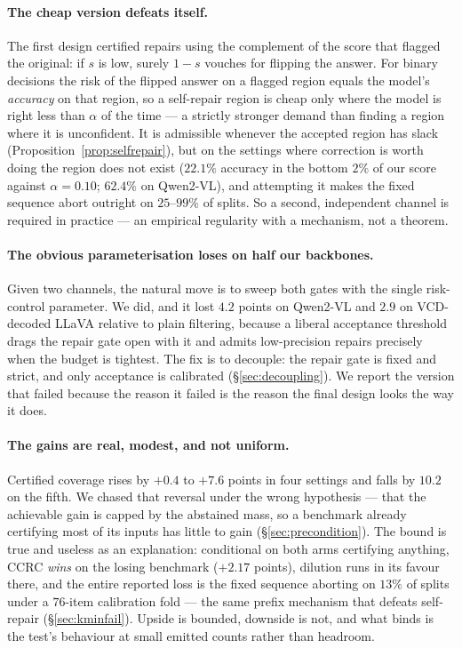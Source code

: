 \documentclass{article}
\theoremstyle{plain}
\theoremstyle{definition}
\theoremstyle{remark}
\begin{document}
\paragraph{The cheap version defeats itself.}
The first design certified repairs using the complement of the score that flagged the
original: if $s$ is low, surely $1-s$ vouches for flipping the answer. For binary decisions
the risk of the flipped answer on a flagged region equals the model's \emph{accuracy} on that
region, so a self-repair region is cheap only where the model is right less than $\alpha$ of
the time --- a strictly stronger demand than finding a region where it is unconfident. It is
admissible whenever the accepted region has slack (Proposition~\ref{prop:selfrepair}), but on
the settings where correction is worth doing the region does not exist ($22.1\%$ accuracy in
the bottom $2\%$ of our score against $\alpha=0.10$; $62.4\%$ on Qwen2-VL), and attempting it
makes the fixed sequence abort outright on $25$--$99\%$ of splits. So a second, independent
channel is required in practice --- an empirical regularity with a mechanism, not a theorem.

\paragraph{The obvious parameterisation loses on half our backbones.}
Given two channels, the natural move is to sweep both gates with the single risk-control
parameter. We did, and it lost $4.2$ points on Qwen2-VL and $2.9$ on VCD-decoded LLaVA
relative to plain filtering, because a liberal acceptance threshold drags the repair gate
open with it and admits low-precision repairs precisely when the budget is tightest. The
fix is to decouple: the repair gate is fixed and strict, and only acceptance is calibrated
(\S\ref{sec:decoupling}). We report the version that failed because the reason it failed is
the reason the final design looks the way it does.

\paragraph{The gains are real, modest, and not uniform.}
Certified coverage rises by $+0.4$ to $+7.6$ points in four settings and falls by $10.2$ on
the fifth. We chased that reversal under the wrong hypothesis --- that the achievable gain is
capped by the abstained mass, so a benchmark already certifying most of its inputs has little
to gain (\S\ref{sec:precondition}). The bound is true and useless as an explanation:
conditional on both arms certifying anything, CCRC \emph{wins} on the losing benchmark
($+2.17$ points), dilution runs in its favour there, and the entire reported loss is the fixed
sequence aborting on $13\%$ of splits under a $76$-item calibration fold --- the same prefix
mechanism that defeats self-repair (\S\ref{sec:kminfail}). Upside is bounded, downside is not,
and what binds is the test's behaviour at small emitted counts rather than headroom.
\end{document}
